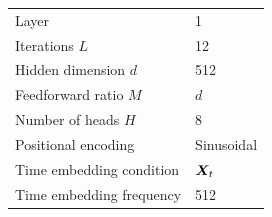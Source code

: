 \begin{table}[htbp]
\begin{minipage}[t]{0.49\textwidth}
\begin{tabular}{ll}
            Layer  &  1 \\
            Iterations $L$  & 12 \\
            Hidden dimension $d$ & 512 \\
            Feedforward ratio $M$ & $d$ \\
            Number of heads $H$ & 8 \\
            Positional encoding & Sinusoidal\\
            Time embedding condition & ${\bm{X}}_t$ \\
            Time embedding frequency & 512 \\
            \bottomrule
        \end{tabular}
    \end{minipage}
\end{table}


